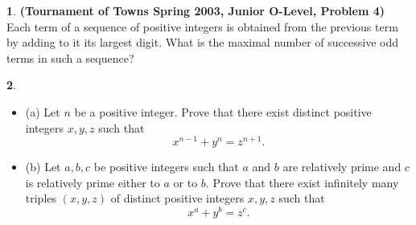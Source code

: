 \documentclass{article}
\newcommand{\plus}{+}
\newcommand{\minus}{-}
\newcommand{\equal}{=}
\theoremstyle{definition}
\newtheorem{p}{}
\begin{document}
\begin{p}{\bf (Tournament of Towns Spring 2003, Junior O-Level, Problem 4)}
Each term of a sequence of positive integers is obtained from the previous term by adding to it its largest digit. What is the maximal number of successive odd terms in such a sequence?
\end{p}




\begin{p}
\begin{itemize}
\item (a) Let $ n$ be a positive integer. Prove that there exist distinct positive integers $ x, y, z$ such that
\[ x^{n\minus{}1} \plus{} y^n \equal{} z^{n\plus{}1}.\]

\item (b) Let $ a, b, c$ be positive integers such that $ a$ and $ b$ are relatively prime and $ c$ is relatively prime either to $ a$ or to $ b.$ Prove that there exist infinitely many triples $ (x, y, z)$ of distinct positive integers $ x, y, z$ such that
\[ x^a \plus{} y^b \equal{} z^c.\]
\end{itemize}
\end{p}
\end{document}
